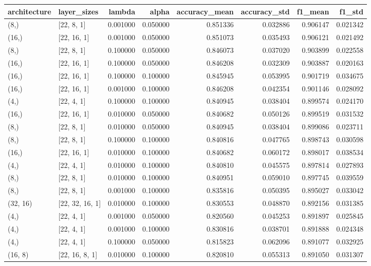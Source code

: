 \begin{tabular}{llrrrrrr}
\toprule
architecture & layer_sizes & lambda & alpha & accuracy_mean & accuracy_std & f1_mean & f1_std \\
\midrule
(8,) & [22, 8, 1] & 0.001000 & 0.050000 & 0.851336 & 0.032886 & 0.906147 & 0.021342 \\
(16,) & [22, 16, 1] & 0.001000 & 0.050000 & 0.851073 & 0.035493 & 0.906121 & 0.021492 \\
(8,) & [22, 8, 1] & 0.100000 & 0.050000 & 0.846073 & 0.037020 & 0.903899 & 0.022558 \\
(16,) & [22, 16, 1] & 0.100000 & 0.050000 & 0.846208 & 0.032309 & 0.903887 & 0.020163 \\
(16,) & [22, 16, 1] & 0.100000 & 0.100000 & 0.845945 & 0.053995 & 0.901719 & 0.034675 \\
(16,) & [22, 16, 1] & 0.001000 & 0.100000 & 0.846208 & 0.042354 & 0.901146 & 0.028092 \\
(4,) & [22, 4, 1] & 0.100000 & 0.100000 & 0.840945 & 0.038404 & 0.899574 & 0.024170 \\
(16,) & [22, 16, 1] & 0.010000 & 0.050000 & 0.840682 & 0.050126 & 0.899519 & 0.031532 \\
(8,) & [22, 8, 1] & 0.010000 & 0.050000 & 0.840945 & 0.038404 & 0.899086 & 0.023711 \\
(8,) & [22, 8, 1] & 0.100000 & 0.100000 & 0.840816 & 0.047765 & 0.898743 & 0.030598 \\
(16,) & [22, 16, 1] & 0.010000 & 0.100000 & 0.840682 & 0.060172 & 0.898017 & 0.038534 \\
(4,) & [22, 4, 1] & 0.010000 & 0.100000 & 0.840810 & 0.045575 & 0.897814 & 0.027893 \\
(8,) & [22, 8, 1] & 0.010000 & 0.100000 & 0.840951 & 0.059010 & 0.897745 & 0.039559 \\
(8,) & [22, 8, 1] & 0.001000 & 0.100000 & 0.835816 & 0.050395 & 0.895027 & 0.033042 \\
(32, 16) & [22, 32, 16, 1] & 0.010000 & 0.100000 & 0.830553 & 0.048870 & 0.892156 & 0.031385 \\
(4,) & [22, 4, 1] & 0.001000 & 0.050000 & 0.820560 & 0.045253 & 0.891897 & 0.025845 \\
(4,) & [22, 4, 1] & 0.001000 & 0.100000 & 0.830816 & 0.038701 & 0.891888 & 0.024348 \\
(4,) & [22, 4, 1] & 0.100000 & 0.050000 & 0.815823 & 0.062096 & 0.891077 & 0.032925 \\
(16, 8) & [22, 16, 8, 1] & 0.010000 & 0.100000 & 0.820810 & 0.055313 & 0.891050 & 0.031307 \\

\end{tabular}
